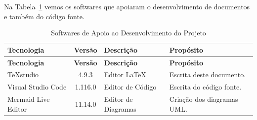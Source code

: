 
Na Tabela~\ref{tabela-software} vemos os softwares que apoiaram o desenvolvimento de documentos e também do código fonte.

\begin{footnotesize}
\begin{longtable}{|p{2.5cm}|c|p{5cm}|p{5.5cm}|}
	\caption{Softwares de Apoio ao Desenvolvimento do Projeto}	
	\label{tabela-software}\\\hline
	
	\rowcolor{lightgray}
	\textbf{Tecnologia} & \textbf{Versão} & \textbf{Descrição} & \textbf{Propósito} \\\hline 
	\endfirsthead
	\hline
	\rowcolor{lightgray}
	\textbf{Tecnologia} & \textbf{Versão} & \textbf{Descrição} & \textbf{Propósito} \\\hline 
	\endhead
		
	TeXstudio & 4.9.3 & Editor LaTeX & Escrita deste documento. \\ \hline
	Visual Studio Code & 1.116.0 & Editor de Código & Escrita do código fonte. \\ \hline
	Mermaid Live Editor & 11.14.0 & Editor de Diagramas & Criação dos diagramas UML. \\ \hline
\end{longtable}
\end{footnotesize}
